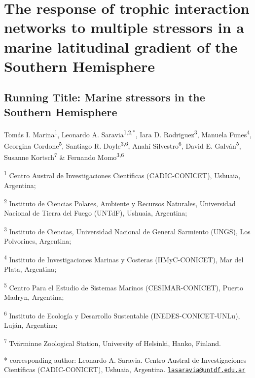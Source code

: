 \documentclass[
]{article}
\author{}
\date{\vspace{-2.5em}}
\begin{document}
\hypertarget{the-response-of-trophic-interaction-networks-to-multiple-stressors-in-a-marine-latitudinal-gradient-of-the-southern-hemisphere}{%
\section{The response of trophic interaction networks to multiple
stressors in a marine latitudinal gradient of the Southern
Hemisphere}\label{the-response-of-trophic-interaction-networks-to-multiple-stressors-in-a-marine-latitudinal-gradient-of-the-southern-hemisphere}}

\hypertarget{running-title-marine-stressors-in-the-southern-hemisphere}{%
\subsection{Running Title: Marine stressors in the Southern
Hemisphere}\label{running-title-marine-stressors-in-the-southern-hemisphere}}

Tomás I. Marina\textsuperscript{1}, Leonardo A.
Saravia\textsuperscript{1,2,*}, Iara D. Rodriguez\textsuperscript{3},
Manuela Funes\textsuperscript{4}, Georgina Cordone\textsuperscript{5},
Santiago R. Doyle\textsuperscript{3,6}, Anahí
Silvestro\textsuperscript{6}, David E. Galván\textsuperscript{5},
Susanne Kortsch\textsuperscript{7} \& Fernando Momo\textsuperscript{3,6}

\textsuperscript{1} Centro Austral de Investigaciones Científicas
(CADIC-CONICET), Ushuaia, Argentina;

\textsuperscript{2} Instituto de Ciencias Polares, Ambiente y Recursos
Naturales, Universidad Nacional de Tierra del Fuego (UNTdF), Ushuaia,
Argentina;

\textsuperscript{3} Instituto de Ciencias, Universidad Nacional de
General Sarmiento (UNGS), Los Polvorines, Argentina;

\textsuperscript{4} Instituto de Investigaciones Marinas y Costeras
(IIMyC-CONICET), Mar del Plata, Argentina;

\textsuperscript{5} Centro Para el Estudio de Sistemas Marinos
(CESIMAR-CONICET), Puerto Madryn, Argentina;

\textsuperscript{6} Instituto de Ecología y Desarrollo Sustentable
(INEDES-CONICET-UNLu), Luján, Argentina;

\textsuperscript{7} Tvärminne Zoological Station, University of
Helsinki, Hanko, Finland.

* corresponding author: Leonardo A. Saravia. Centro Austral de
Investigaciones Científicas (CADIC-CONICET), Ushuaia, Argentina.
\href{mailto:lasaravia@untdf.edu.ar}{\nolinkurl{lasaravia@untdf.edu.ar}}
\end{document}
